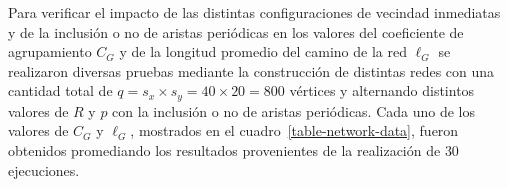 Para verificar el impacto de las distintas configuraciones de vecindad inmediatas y de la inclusi\'on o no de aristas peri\'odicas en los valores del coeficiente de agrupamiento $C_G$ y de la longitud promedio del camino de la red $\ell_G$ se realizaron diversas pruebas mediante la construcci\'on de distintas redes con una cantidad total de $q = s_x \times s_y = 40 \times 20 = 800$ v\'ertices y alternando distintos valores de $R$ y $p$ con la inclusi\'on o no de aristas peri\'odicas. Cada uno de los valores de $C_G$ y $\ell_G$, mostrados en el cuadro~\ref{table-network-data}, fueron obtenidos promediando los resultados provenientes de la realizaci\'on de $30$ ejecuciones. 
\begin{table}[!ht]
\begin{center}
\end{center}
\end{table}
